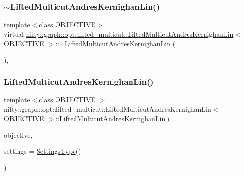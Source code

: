 \subsubsection{\texorpdfstring{$\sim$\+Lifted\+Multicut\+Andres\+Kernighan\+Lin()}{~LiftedMulticutAndresKernighanLin()}}
{\footnotesize\ttfamily template$<$class O\+B\+J\+E\+C\+T\+I\+VE$>$ \\
virtual \hyperlink{classnifty_1_1graph_1_1opt_1_1lifted__multicut_1_1LiftedMulticutAndresKernighanLin}{nifty\+::graph\+::opt\+::lifted\+\_\+multicut\+::\+Lifted\+Multicut\+Andres\+Kernighan\+Lin}$<$ O\+B\+J\+E\+C\+T\+I\+VE $>$\+::$\sim$\hyperlink{classnifty_1_1graph_1_1opt_1_1lifted__multicut_1_1LiftedMulticutAndresKernighanLin}{Lifted\+Multicut\+Andres\+Kernighan\+Lin} (\begin{DoxyParamCaption}{ }\end{DoxyParamCaption})\hspace{0.3cm}{\ttfamily [inline]}, {\ttfamily [virtual]}}

\mbox{\label{classnifty_1_1graph_1_1opt_1_1lifted__multicut_1_1LiftedMulticutAndresKernighanLin_a8c9e5c90d0e26e11a8d020c80624ddad}} 
\subsubsection{\texorpdfstring{Lifted\+Multicut\+Andres\+Kernighan\+Lin()}{LiftedMulticutAndresKernighanLin()}}
{\footnotesize\ttfamily template$<$class O\+B\+J\+E\+C\+T\+I\+VE $>$ \\
\hyperlink{classnifty_1_1graph_1_1opt_1_1lifted__multicut_1_1LiftedMulticutAndresKernighanLin}{nifty\+::graph\+::opt\+::lifted\+\_\+multicut\+::\+Lifted\+Multicut\+Andres\+Kernighan\+Lin}$<$ O\+B\+J\+E\+C\+T\+I\+VE $>$\+::\hyperlink{classnifty_1_1graph_1_1opt_1_1lifted__multicut_1_1LiftedMulticutAndresKernighanLin}{Lifted\+Multicut\+Andres\+Kernighan\+Lin} (\begin{DoxyParamCaption}\item[{const \hyperlink{classnifty_1_1graph_1_1opt_1_1lifted__multicut_1_1LiftedMulticutAndresKernighanLin_a31b45ec18fa430d4f6231a60395b4b14}{Objective\+Type} \&}]{objective,  }\item[{const \hyperlink{structnifty_1_1graph_1_1opt_1_1lifted__multicut_1_1LiftedMulticutAndresKernighanLin_1_1SettingsType}{Settings\+Type} \&}]{settings = {\ttfamily \hyperlink{structnifty_1_1graph_1_1opt_1_1lifted__multicut_1_1LiftedMulticutAndresKernighanLin_1_1SettingsType}{Settings\+Type}()} }\end{DoxyParamCaption})}




